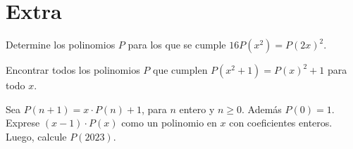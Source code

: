 \section{Extra}

\begin{section-problem}
    Determine los polinomios $P$ para los que se cumple $16P(x^2) = P(2x)^2.$
\end{section-problem}

\begin{section-problem}
    Encontrar todos los polinomios $P$ que cumplen $P(x^2+1) = P(x)^2+1$ para todo $x$.
\end{section-problem}

\begin{section-problem}
    Sea $P(n + 1) = x\cdot P(n) + 1$, para $n$ entero y $n \geq 0$. Además $P(0) = 1$. Exprese $(x-1)\cdot P(x)$ como un polinomio en $x$ con coeficientes enteros. Luego, calcule $P(2023)$.
\end{section-problem}